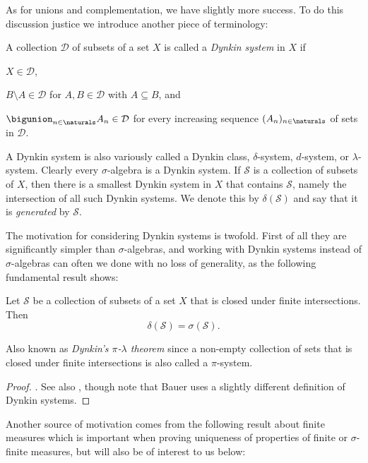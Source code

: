\documentclass[article, a4paper, 11pt, oneside]{memoir}
\numberwithin{equation}{chapter}
\newcommand{\calD}{\mathcal{D}}
\newcommand{\calS}{\mathcal{S}}
\begin{document}
As for unions and complementation, we have slightly more success. To do this discussion justice we introduce another piece of terminology:

\begin{definition}
    A collection $\calD$ of subsets of a set $X$ is called a \emph{Dynkin system} in $X$ if
    \begin{enumdef}
        \item $X \in \calD$,
        \item $B \setminus A \in \calD$ for $A,B \in \calD$ with $A \subseteq B$, and
        \item $\bigunion_{n\in\naturals} A_n \in \calD$ for every increasing sequence $(A_n)_{n\in\naturals}$ of sets in $\calD$.
    \end{enumdef}
\end{definition}
%
A Dynkin system is also variously called a Dynkin class, $\delta$-system, $d$-system, or $\lambda$-system. Clearly every $\sigma$-algebra is a Dynkin system. If $\calS$ is a collection of subsets of $X$, then there is a smallest Dynkin system in $X$ that contains $\calS$, namely the intersection of all such Dynkin systems. We denote this by $\delta(\calS)$ and say that it is \emph{generated} by $\calS$.

The motivation for considering Dynkin systems is twofold. First of all they are significantly simpler than $\sigma$-algebras, and working with Dynkin systems instead of $\sigma$-algebras can often we done with no loss of generality, as the following fundamental result shows:

\begin{theorem}
    Let $\calS$ be a collection of subsets of a set $X$ that is closed under finite intersections. Then
    \begin{equation*}
        \delta(\calS) = \sigma(\calS).
    \end{equation*}
\end{theorem}
%
Also known as \emph{Dynkin's $\pi$-$\lambda$ theorem} since a non-empty collection of sets that is closed under finite intersections is also called a $\pi$-system.

\begin{proof}
    \textcite[Theorem~1.6.2]{cohn2001}. See also \textcite[Theorem~2.3]{bauer2001}, though note that Bauer uses a slightly different definition of Dynkin systems.
\end{proof}

Another source of motivation comes from the following result about finite measures which is important when proving uniqueness of properties of finite or $\sigma$-finite measures, but will also be of interest to us below:
\end{document}
